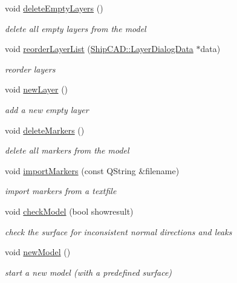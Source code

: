\begin{DoxyCompactItemize}
void \hyperlink{classShipCAD_1_1Controller_a2b966f1434e1df01e0bfd589cdb7425d}{delete\+Empty\+Layers} ()
\begin{DoxyCompactList}\small\item\em delete all empty layers from the model \end{DoxyCompactList}\item 
void \hyperlink{classShipCAD_1_1Controller_a50f9ae11d46f3851c65fa8c969c5f8c3}{reorder\+Layer\+List} (\hyperlink{structShipCAD_1_1LayerDialogData}{Ship\+C\+A\+D\+::\+Layer\+Dialog\+Data} $\ast$data)
\begin{DoxyCompactList}\small\item\em reorder layers \end{DoxyCompactList}\item 
void \hyperlink{classShipCAD_1_1Controller_af94f1596031595184251f2f513ee8bd9}{new\+Layer} ()
\begin{DoxyCompactList}\small\item\em add a new empty layer \end{DoxyCompactList}\item 
void \hyperlink{classShipCAD_1_1Controller_ae9cce4c133abd067d98812eb342663d0}{delete\+Markers} ()
\begin{DoxyCompactList}\small\item\em delete all markers from the model \end{DoxyCompactList}\item 
void \hyperlink{classShipCAD_1_1Controller_ac44acf971478b4ae06e8b8842c91d4b0}{import\+Markers} (const Q\+String \&filename)
\begin{DoxyCompactList}\small\item\em import markers from a textfile \end{DoxyCompactList}\item 
void \hyperlink{classShipCAD_1_1Controller_a901935dbf43aa0181d40e315da8c3902}{check\+Model} (bool showresult)
\begin{DoxyCompactList}\small\item\em check the surface for inconsistent normal directions and leaks \end{DoxyCompactList}\item 
void \hyperlink{classShipCAD_1_1Controller_acdb404d69222d41c55b4358ef844cd8f}{new\+Model} ()
\begin{DoxyCompactList}\small\item\em start a new model (with a predefined surface) \end{DoxyCompactList}\item 

\end{DoxyCompactItemize}
